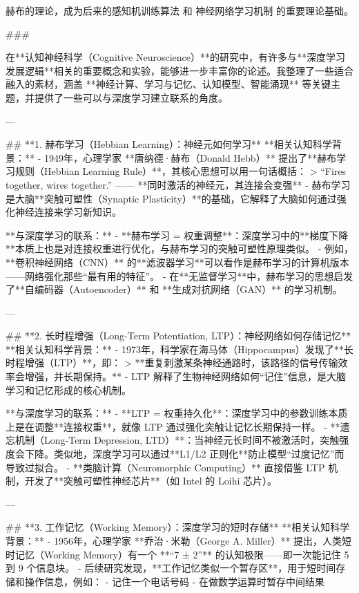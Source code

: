 赫布的理论，成为后来的感知机训练算法 和 神经网络学习机制 的重要理论基础。

###

在**认知神经科学（Cognitive Neuroscience）**的研究中，有许多与**深度学习发展逻辑**相关的重要概念和实验，能够进一步丰富你的论述。我整理了一些适合融入的素材，涵盖 **神经计算、学习与记忆、认知模型、智能涌现** 等关键主题，并提供了一些可以与深度学习建立联系的角度。

---

## **1. 赫布学习（Hebbian Learning）：神经元如何学习**
**相关认知科学背景：**
- 1949年，心理学家 **唐纳德·赫布（Donald Hebb）** 提出了**赫布学习规则（Hebbian Learning Rule）**，其核心思想可以用一句话概括：
  > “Fires together, wires together.” —— **同时激活的神经元，其连接会变强**
- 赫布学习是大脑**突触可塑性（Synaptic Plasticity）**的基础，它解释了大脑如何通过强化神经连接来学习新知识。

**与深度学习的联系：**
- **赫布学习 = 权重调整**：深度学习中的**梯度下降**本质上也是对连接权重进行优化，与赫布学习的突触可塑性原理类似。
- 例如，**卷积神经网络（CNN）** 的**滤波器学习**可以看作是赫布学习的计算机版本——网络强化那些“最有用的特征”。
- 在**无监督学习**中，赫布学习的思想启发了**自编码器（Autoencoder）** 和 **生成对抗网络（GAN）** 的学习机制。

---

## **2. 长时程增强（Long-Term Potentiation, LTP）：神经网络如何存储记忆**
**相关认知科学背景：**
- 1973年，科学家在海马体（Hippocampus）发现了**长时程增强（LTP）**，即：
  > **重复刺激某条神经通路时，该路径的信号传输效率会增强，并长期保持。**
- LTP 解释了生物神经网络如何“记住”信息，是大脑学习和记忆形成的核心机制。

**与深度学习的联系：**
- **LTP = 权重持久化**：深度学习中的参数训练本质上是在调整**连接权重**，就像 LTP 通过强化突触让记忆长期保持一样。
- **遗忘机制（Long-Term Depression, LTD）**：当神经元长时间不被激活时，突触强度会下降。类似地，深度学习可以通过**L1/L2 正则化**防止模型“过度记忆”而导致过拟合。
- **类脑计算（Neuromorphic Computing）** 直接借鉴 LTP 机制，开发了**突触可塑性神经芯片**（如 Intel 的 Loihi 芯片）。

---

## **3. 工作记忆（Working Memory）：深度学习的短时存储**
**相关认知科学背景：**
- 1956年，心理学家 **乔治·米勒（George A. Miller）** 提出，人类短时记忆（Working Memory）有一个 **“7 ± 2”** 的认知极限——即一次能记住 5 到 9 个信息块。
- 后续研究发现，**工作记忆类似一个暂存区**，用于短时间存储和操作信息，例如：
  - 记住一个电话号码
  - 在做数学运算时暂存中间结果

